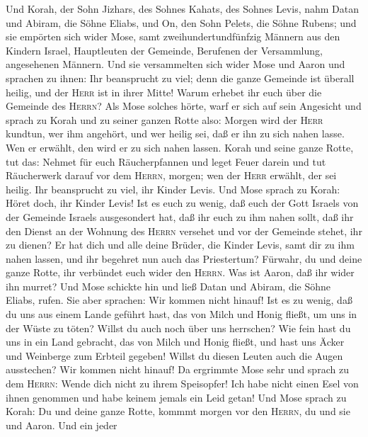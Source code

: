  Und Korah, der Sohn Jizhars, des Sohnes Kahats, des
Sohnes Levis, nahm Datan und Abiram, die Söhne Eliabs, und On, den Sohn
Pelets, die Söhne Rubens;  und sie empörten sich wider
Mose, samt zweihundertundfünfzig Männern aus den Kindern Israel,
Hauptleuten der Gemeinde, Berufenen der Versammlung, angesehenen
Männern.  Und sie versammelten sich wider Mose und Aaron
und sprachen zu ihnen: Ihr beansprucht zu viel; denn die ganze Gemeinde
ist überall heilig, und der \textsc{Herr} ist in ihrer Mitte! Warum
erhebet ihr euch über die Gemeinde des \textsc{Herrn}? 
Als Mose solches hörte, warf er sich auf sein Angesicht und sprach zu
Korah und zu seiner ganzen Rotte also:  Morgen wird der
\textsc{Herr} kundtun, wer ihm angehört, und wer heilig sei, daß er ihn
zu sich nahen lasse. Wen er erwählt, den wird er zu sich nahen lassen.
 Korah und seine ganze Rotte, tut das: Nehmet für euch
Räucherpfannen  und leget Feuer darein und tut Räucherwerk
darauf vor dem \textsc{Herrn}, morgen;  wen der
\textsc{Herr} erwählt, der sei heilig. Ihr beansprucht zu viel, ihr
Kinder Levis. Und Mose sprach zu Korah: Höret doch, ihr Kinder Levis!
 Ist es euch zu wenig, daß euch der Gott Israels von der
Gemeinde Israels ausgesondert hat, daß ihr euch zu ihm nahen sollt, daß
ihr den Dienst an der Wohnung des \textsc{Herrn} versehet und vor der
Gemeinde stehet, ihr zu dienen?  Er hat dich und alle
deine Brüder, die Kinder Levis, samt dir zu ihm nahen lassen, und ihr
begehret nun auch das Priestertum?  Fürwahr, du und deine
ganze Rotte, ihr verbündet euch wider den \textsc{Herrn}. Was ist Aaron,
daß ihr wider ihn murret?  Und Mose schickte hin und ließ
Datan und Abiram, die Söhne Eliabs, rufen. Sie aber sprachen: Wir kommen
nicht hinauf!  Ist es zu wenig, daß du uns aus einem
Lande geführt hast, das von Milch und Honig fließt, um uns in der Wüste
zu töten? Willst du auch noch über uns herrschen?  Wie
fein hast du uns in ein Land gebracht, das von Milch und Honig fließt,
und hast uns Äcker und Weinberge zum Erbteil gegeben! Willst du diesen
Leuten auch die Augen ausstechen? Wir kommen nicht hinauf!
 Da ergrimmte Mose sehr und sprach zu dem \textsc{Herrn}:
Wende dich nicht zu ihrem Speisopfer! Ich habe nicht einen Esel von
ihnen genommen und habe keinem jemals ein Leid getan! 
Und Mose sprach zu Korah: Du und deine ganze Rotte, kommmt morgen vor
den \textsc{Herrn}, du und sie und Aaron.  Und ein jeder

